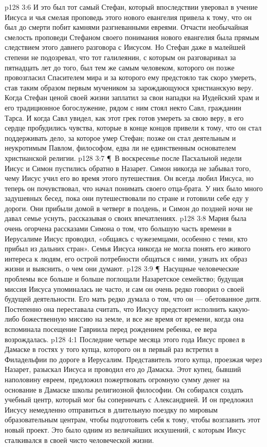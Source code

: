 \vs p128 3:6 И это был тот самый Стефан, который впоследствии уверовал в учение Иисуса и чья смелая проповедь этого нового евангелия привела к тому, что он был до смерти побит камнями разгневанными евреями. Отчасти необычайная смелость проповеди Стефаном своего понимания нового евангелия была прямым следствием этого давнего разговора с Иисусом. Но Стефан даже в малейшей степени не подозревал, что тот галилеянин, с которым он разговаривал за пятнадцать лет до того, был тем же самым человеком, которого он позже провозгласил Спасителем мира и за которого ему предстояло так скоро умереть, став таким образом первым мучеником за зарождающуюся христианскую веру. Когда Стефан ценой своей жизни заплатил за свои нападки на Иудейский храм и его традиционное богослужение, рядом с ним стоял некто Савл, гражданин Тарса. И когда Савл увидел, как этот грек готов умереть за свою веру, в его сердце пробудились чувства, которые в конце концов привели к тому, что он стал поддерживать дело, за которое умер Стефан; позже он стал деятельным и неукротимым Павлом, философом, едва ли не единственным основателем христианской религии.
\vs p128 3:7 \P\ В воскресенье после Пасхальной недели Иисус и Симон пустились обратно в Назарет. Симон никогда не забывал того, чему Иисус учил его во время этого путешествия. Он всегда любил Иисуса, но теперь он почувствовал, что начал понимать своего отца\hyp{}брата. У них было много задушевных бесед, пока они путешествовали по стране и готовили себе еду у дороги. Они прибыли домой в четверг в полдень, и Симон до поздней ночи не давал семье уснуть, рассказывая о своих впечатлениях.
\vs p128 3:8 Мария была очень огорчена рассказами Симона о том, что большую часть времени в Иерусалиме Иисус проводил, «общаясь с чужеземцами, особенно с теми, кто прибыл из дальних стран». Семья Иисуса никогда не могла понять его живого интереса к людям, его острой потребности общаться с ними, узнать их образ жизни и выяснить, о чем они думают.
\vs p128 3:9 \P\ Насущные человеческие проблемы все больше и больше поглощали Назаретское семейство; будущая миссия Иисуса упоминалась не часто, и сам он очень редко говорил о своей будущей деятельности. Его мать редко думала о том, что он --- обетованное дитя. Постепенно она переставала считать, что Иисусу предстоит исполнить какую\hyp{}либо божественную миссию на земле, и все же время от времени, когда она вспоминала посещение Гавриила перед рождением ребенка, ее вера возрождалась.
\vs p128 4:1 Последние четыре месяца этого года Иисус провел в Дамаске в гостях у того купца, которого он в первый раз встретил в Филадельфии по дороге в Иерусалим. Представитель этого купца, проезжая через Назарет, разыскал Иисуса и проводил его до Дамаска. Этот купец, бывший наполовину евреем, предложил пожертвовать огромную сумму денег на основание в Дамаске школы религиозной философии. Он собирался создать учебный центр, который мог бы соперничать с Aлександрией. И он предложил Иисусу немедленно отправиться в длительную поездку по мировым образовательным центрам, чтобы подготовить себя к тому, чтобы возглавить этот новый проект. Это было одним из величайших искушений, с которым Иисус сталкивался в своей чисто человеческой жизни.
